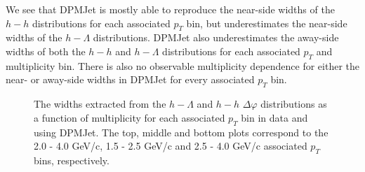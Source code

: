 We see that DPMJet is mostly able to reproduce the near-side widths of the $h-h$ distributions for each associated $p_{T}$ bin, but underestimates the near-side widths of the $h-\Lambda$ distributions. DPMJet also underestimates the away-side widths of both the $h-h$ and $h-\Lambda$ distributions for each associated $p_{T}$ and multiplicity bin. There is also no observable multiplicity dependence for either the near- or away-side widths in DPMJet for every associated $p_{T}$ bin.

\begin{figure}[ht]
\centering
\begin{subfigure}{
\texttt{[image: figures/von\_mises\_widths\_with\_dpmjet.pdf]}}
\end{subfigure}
\begin{subfigure}{
\texttt{[image: figures/von\_mises\_widths\_lowpt\_with\_dpmjet.pdf]}}
\end{subfigure}
\begin{subfigure}{
\texttt{[image: figures/von\_mises\_widths\_highpt\_with\_dpmjet.pdf]}}
\end{subfigure}
\caption{The widths extracted from the $h-\Lambda$ and $h-h$ $\Delta\varphi$ distributions as a function of multiplicity for each associated $p_{T}$ bin in data and using DPMJet. The top, middle and bottom plots correspond to the 2.0 - 4.0 GeV/c, 1.5 - 2.5 GeV/c and 2.5 - 4.0 GeV/c associated $p_{T}$ bins, respectively.}
\label{width_modelcomp_figure}
\end{figure}